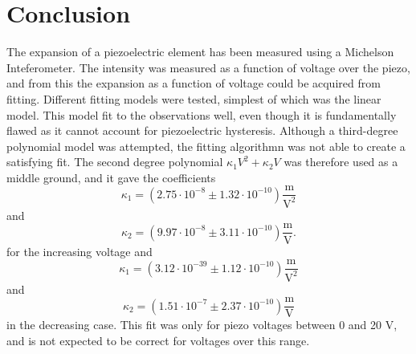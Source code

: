 \chapter{Conclusion}
The expansion of a piezoelectric element has been measured using a Michelson Inteferometer.
The intensity was measured as a function of voltage over the piezo, 
and from this the expansion as a function of voltage could be acquired from fitting.
Different fitting models were tested, simplest of which was the linear model.
This model fit to the observations well, 
even though it is fundamentally flawed as it cannot account for piezoelectric hysteresis.
Although a third-degree polynomial model was attempted, the fitting algorithmn was not able to create a satisfying fit.
The second degree polynomial $\kappa_1V^2 + \kappa_2 V$ was therefore used as a middle ground, and it gave the coefficients 
\[\kappa_1 = (2.75\cdot 10^{-8} \pm 1.32 \cdot 10^{-10}) \frac{\text{m}}{\text{V}^2}\]
and 
\[\kappa_2 = (9.97\cdot 10^{-8} \pm 3.11 \cdot 10^{-10}) \frac{\text{m}}{\text{V}}.\]
for the increasing voltage and 
\[\kappa_1 = (3.12\cdot 10^{-39} \pm 1.12 \cdot 10^{-10}) \frac{\text{m}}{\text{V}^2}\]
and 
\[\kappa_2 = (1.51\cdot 10^{-7} \pm 2.37 \cdot 10^{-10}) \frac{\text{m}}{\text{V}}\]
in the decreasing case. This fit was only for piezo voltages between 0 and 20 V, 
and is not expected to be correct for voltages over this range.
